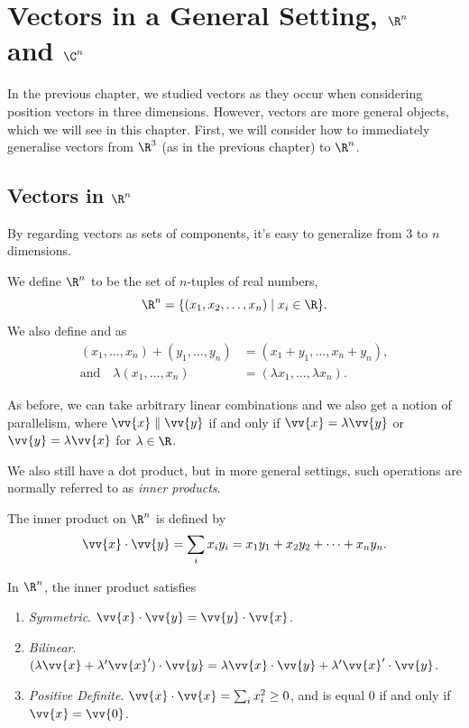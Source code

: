 \section{Vectors in a General Setting, $\R^n$ and $\C^n$}

In the previous chapter, we studied vectors as they occur when considering position vectors in three dimensions. However, vectors are more general objects, which we will see in this chapter. First, we will consider how to immediately generalise vectors from $\R^3$ (as in the previous chapter) to $\R^n$.

\subsection{Vectors in $\R^n$}

By regarding vectors as sets of components, it's easy to generalize from 3 to $n$ dimensions.

\begin{definition}[$\R^n$ Space]
    We define $\R^n$ to be the set of $n$-tuples of real numbers,
    $$
    \R^n = \{(x_1, x_2, \dots, x_n) \mid x_i \in \R\}.
    $$ 
    We also define  and  as
    \begin{align*}
        (x_1, \dots, x_n) + (y_1, \dots, y_n) &= (x_1 + y_1, \dots, x_n + y_n),\\
       \text{and} \quad \lambda (x_1, \dots, x_n) &= (\lambda x_1, \dots, \lambda x_n).
    \end{align*}
\end{definition}

As before, we can take arbitrary linear combinations and we also get a notion of parallelism, where $\vv{x} \parallel \vv{y}$ if and only if $\vv{x} = \lambda \vv{y}$ or $\vv{y} = \lambda \vv{x}$ for $\lambda \in \R$.

We also still have a dot product, but in more general settings, such operations are normally referred to as \emph{inner products}.

\begin{definition}
    The inner product on $\R^n$ is defined by
    $$
    \vv{x} \cdot \vv{y} = \sum_{i} x_i y_i = x_1 y_1 + x_2 y_2 + \cdots + x_n y_n.
    $$
\end{definition}

\begin{proposition}
    In $\R^n$, the inner product satisfies
    \begin{enumerate}[label=(\roman*)]
        \item \emph{Symmetric}. $\vv{x} \cdot \vv{y} = \vv{y} \cdot \vv{x}$.
        \item \emph{Bilinear}. $(\lambda \vv{x} + \lambda' \vv{x}') \cdot \vv{y} = \lambda \vv{x} \cdot \vv{y} + \lambda' \vv{x}' \cdot \vv{y}$.
        \item \emph{Positive Definite}. $\vv{x} \cdot \vv{x} = \sum_{i} x_i ^2 \geq 0$, and is equal 0 if and only if $\vv{x} = \vv{0}$. 
    \end{enumerate}
\end{proposition}

